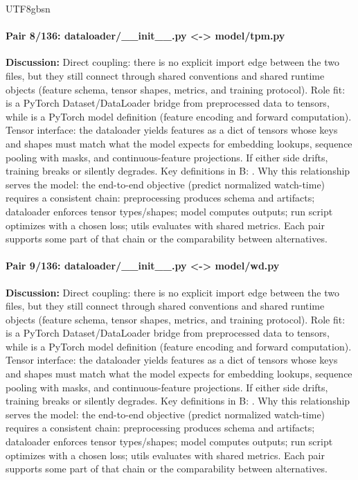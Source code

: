 \documentclass[11pt]{article}
\begin{document}
\begin{CJK*}{UTF8}{gbsn}
\paragraph{Pair 8/136: dataloader/\_\_init\_\_.py <-> model/tpm.py}
\textbf{Discussion:} Direct coupling: there is no explicit import edge between the two files, but they still connect through shared conventions and shared runtime objects (feature schema, tensor shapes, metrics, and training protocol). Role fit: \texttt{} is a PyTorch Dataset/DataLoader bridge from preprocessed data to tensors, while \texttt{} is a PyTorch model definition (feature encoding and forward computation). Tensor interface: the dataloader yields features as a dict of tensors whose keys and shapes must match what the model expects for embedding lookups, sequence pooling with masks, and continuous-feature projections. If either side drifts, training breaks or silently degrades. Key definitions in B: \texttt{}. Why this relationship serves the model: the end-to-end objective (predict normalized watch-time) requires a consistent chain: preprocessing produces schema and artifacts; dataloader enforces tensor types/shapes; model computes outputs; run script optimizes with a chosen loss; utils evaluates with shared metrics. Each pair supports some part of that chain or the comparability between alternatives.

\paragraph{Pair 9/136: dataloader/\_\_init\_\_.py <-> model/wd.py}
\textbf{Discussion:} Direct coupling: there is no explicit import edge between the two files, but they still connect through shared conventions and shared runtime objects (feature schema, tensor shapes, metrics, and training protocol). Role fit: \texttt{} is a PyTorch Dataset/DataLoader bridge from preprocessed data to tensors, while \texttt{} is a PyTorch model definition (feature encoding and forward computation). Tensor interface: the dataloader yields features as a dict of tensors whose keys and shapes must match what the model expects for embedding lookups, sequence pooling with masks, and continuous-feature projections. If either side drifts, training breaks or silently degrades. Key definitions in B: \texttt{}. Why this relationship serves the model: the end-to-end objective (predict normalized watch-time) requires a consistent chain: preprocessing produces schema and artifacts; dataloader enforces tensor types/shapes; model computes outputs; run script optimizes with a chosen loss; utils evaluates with shared metrics. Each pair supports some part of that chain or the comparability between alternatives.


\end{CJK*}
\end{document}
